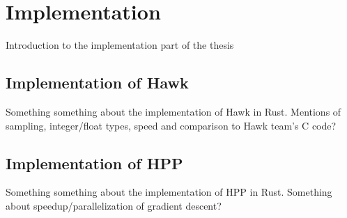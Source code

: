 \chapter{Implementation}
Introduction to the implementation part of the thesis
\section{Implementation of Hawk}
Something something about the implementation of Hawk in Rust.
Mentions of sampling, integer/float types, speed and comparison to Hawk team's C code? \hfill \break \\
\section{Implementation of HPP}
Something something about the implementation of HPP in Rust. Something about speedup/parallelization of gradient descent?

